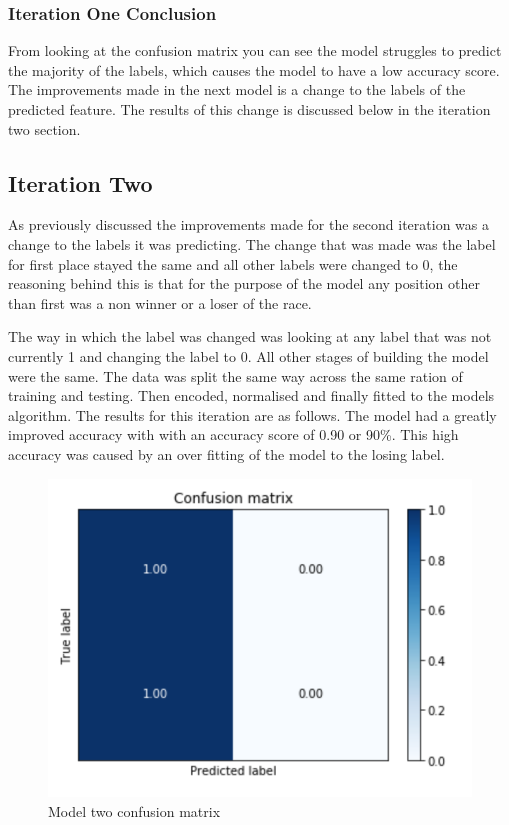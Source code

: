 \subsubsection{Iteration One Conclusion}
From looking at the confusion matrix you can see the model struggles to predict the majority of the labels, which causes the model to have a low accuracy score. The improvements made in the next model is a change to the labels of the predicted feature. The results of this change is discussed below in the iteration two section. 


\subsection{Iteration Two}
As previously discussed the improvements made for the second iteration was a change to the labels it was predicting. The change that was made was the label for first place stayed the same and all other labels were changed to 0, the reasoning behind this is that for the purpose of the model any position other than first was a non winner or a loser of the race.

The way in which the label was changed was looking at any label that was not currently 1 and changing the label to 0. All other stages of building the model were the same. The data was split the same way across the same ration of training and testing. Then encoded, normalised and finally fitted to the models algorithm. The results for this iteration are as follows. The model had a greatly improved accuracy with with an accuracy score of 0.90 or 90\%. This high accuracy was caused by an over fitting of the model to the losing label. 
\begin{figure}[h!]
  \centering
  \includegraphics[width = (\textwidth)/2]{model2.png}
  \caption{Model two confusion matrix}
  \label{fig:M2CF}
\end{figure}


